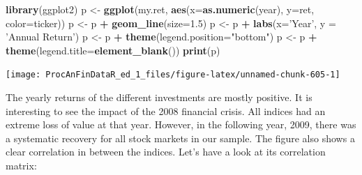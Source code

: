 \documentclass[11pt,]{book}
\newenvironment{Shaded}{\begin{snugshade}}{\end{snugshade}}
\newcommand{\KeywordTok}[1]{\textcolor[rgb]{0.27,0.27,0.27}{\textbf{#1}}}
\newcommand{\DataTypeTok}[1]{\textcolor[rgb]{0.27,0.27,0.27}{#1}}
\newcommand{\FloatTok}[1]{\textcolor[rgb]{0.06,0.06,0.06}{#1}}
\newcommand{\StringTok}[1]{\textcolor[rgb]{0.5,0.5,0.5}{#1}}
\newcommand{\CommentTok}[1]{\textcolor[rgb]{0.56,0.35,0.01}{\textit{#1}}}
\newcommand{\OtherTok}[1]{\textcolor[rgb]{0.56,0.35,0.01}{#1}}
\newcommand{\OperatorTok}[1]{\textcolor[rgb]{0.81,0.36,0.00}{\textbf{#1}}}
\newcommand{\NormalTok}[1]{#1}
\begin{document}
\begin{Shaded}
\begin{Highlighting}[]
\KeywordTok{library}\NormalTok{(ggplot2)}
\NormalTok{p <-}\StringTok{ }\KeywordTok{ggplot}\NormalTok{(my.ret, }\KeywordTok{aes}\NormalTok{(}\DataTypeTok{x=}\KeywordTok{as.numeric}\NormalTok{(year), }
                        \DataTypeTok{y=}\NormalTok{ret, }
                        \DataTypeTok{color=}\NormalTok{ticker))}
\NormalTok{p <-}\StringTok{ }\NormalTok{p }\OperatorTok{+}\StringTok{ }\KeywordTok{geom_line}\NormalTok{(}\DataTypeTok{size=}\FloatTok{1.5}\NormalTok{)}
\NormalTok{p <-}\StringTok{ }\NormalTok{p }\OperatorTok{+}\StringTok{ }\KeywordTok{labs}\NormalTok{(}\DataTypeTok{x=}\StringTok{'Year'}\NormalTok{, }\DataTypeTok{y =} \StringTok{'Annual Return'}\NormalTok{)}
\NormalTok{p <-}\StringTok{ }\NormalTok{p }\OperatorTok{+}\StringTok{ }\KeywordTok{theme}\NormalTok{(}\DataTypeTok{legend.position=}\StringTok{"bottom"}\NormalTok{)}
\NormalTok{p <-}\StringTok{ }\NormalTok{p }\OperatorTok{+}\StringTok{ }\KeywordTok{theme}\NormalTok{(}\DataTypeTok{legend.title=}\KeywordTok{element_blank}\NormalTok{())}
\KeywordTok{print}\NormalTok{(p)}
\end{Highlighting}
\end{Shaded}

\begin{center}\texttt{[image: ProcAnFinDataR\_ed\_1\_files/figure-latex/unnamed-chunk-605-1]} \end{center}

The yearly returns of the different investments are mostly positive. It
is interesting to see the impact of the 2008 financial crisis. All
indices had an extreme loss of value at that year. However, in the
following year, 2009, there was a systematic recovery for all stock
markets in our sample. The figure also shows a clear correlation in
between the indices. Let's have a look at its correlation matrix:

\begin{Shaded}
\end{Shaded}
\end{document}
